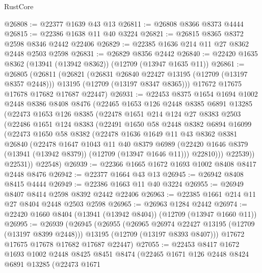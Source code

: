 \begin{lexlean}{RustCore}
\begin{coremodule}
@26808 := @22377 @1639 @43 @13
@26811 := @26808 @8366 @8373 @4444
@26815 := @22386 @1638 @11 @40 @3224
@26821 := @26815 @8365 @8372 @2598 @8346 @2442 @22406
@26829 := @22385 @1636 @214 @11 @27 @8362 @2448 @2503 @2598
@26831 := @26829 @8356 @2442
@26840 := @22420 @1635 @8362 (@13941 (@13942 @8362)) (@12709 (@13947 @1635 @11))
@26861 := @26805
    (@26811
      (@26821
        (@26831 @26840 @22427 @13195 (@12709 (@13197 @8357 @2448)))
        @13195
        (@12709 (@13197 @8347 @8365)))
      @17672
      @17675
      @17678
      @17682
      @17687
      @22447)
@26931 := @22453
    @8375
    @1654
    @1694
    @1002
    @2448
    @8386
    @8408
    @8476
    (@22465
      @1653
      @126
      @2448
      @8385
      @6891
      @13285
      (@22473
        @1653
        @126
        @8385
        (@22478
          @1651
          @214
          @124
          @27
          @8383
          @2503
          (@22486
            @1651
            @124
            @8383
            (@22491
              @1650
              @58
              @2448
              @8382
              @6894
              @16099
              (@22473
                @1650
                @58
                @8382
                (@22478
                  @1636
                  @1649
                  @11
                  @43
                  @8362
                  @8381
                  @26840
                  (@22478
                    @1647
                    @1043
                    @11
                    @40
                    @8379
                    @6989
                    (@22420 @1646 @8379 (@13941 (@13942 @8379)) (@12709 (@13947 @1646 @11)))
                    @22810)))
              @22539))
          @22531))
      @22548)
@26939 := @22366 @1665 @1672 @1693 @1002 @8408 @8417 @2448 @8476
@26942 := @22377 @1664 @43 @13
@26945 := @26942 @8408 @8415 @4444
@26949 := @22386 @1663 @11 @40 @3224
@26955 := @26949 @8407 @8414 @2598 @8392 @2442 @22406
@26963 := @22385 @1661 @214 @11 @27 @8404 @2448 @2503 @2598
@26965 := @26963 @1284 @2442
@26974 := @22420 @1660 @8404 (@13941 (@13942 @8404)) (@12709 (@13947 @1660 @11))
@26995 := @26939
    (@26945
      (@26955
        (@26965 @26974 @22427 @13195 (@12709 (@13197 @8399 @2448)))
        @13195
        (@12709 (@13197 @8393 @8407)))
      @17672
      @17675
      @17678
      @17682
      @17687
      @22447)
@27055 := @22453
    @8417
    @1672
    @1693
    @1002
    @2448
    @8425
    @8451
    @8474
    (@22465
      @1671
      @126
      @2448
      @8424
      @6891
      @13285
      (@22473
        @1671

\end{coremodule}
\end{lexlean}
